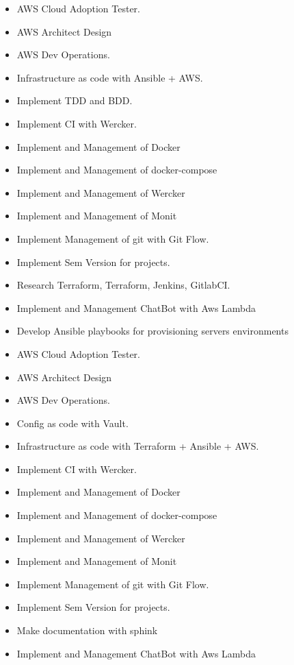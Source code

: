 \documentclass[10pt,a4paper]{altacv}
\begin{document}
\begin{itemize}
  \item AWS Cloud Adoption Tester.
  \item AWS Architect Design
  \item AWS Dev Operations.
  \item Infrastructure as code with Ansible + AWS.
  \item Implement TDD and BDD.
  \item Implement CI with Wercker.
  \item Implement and Management of Docker
  \item Implement and Management of docker-compose
  \item Implement and Management of Wercker
  \item Implement and Management of Monit
  \item Implement Management of git with Git Flow.
  \item Implement Sem Version for projects.
  \item Research Terraform, Terraform, Jenkins, GitlabCI.
  \item Implement and Management ChatBot with Aws Lambda
\end{itemize}

\divider

\begin{itemize}
  \item Develop Ansible playbooks for provisioning servers environments
  \item AWS Cloud Adoption Tester.
  \item AWS Architect Design
  \item AWS Dev Operations.
  \item Config as code with Vault.
  \item Infrastructure as code with Terraform + Ansible + AWS.
  \item Implement CI with Wercker.
  \item Implement and Management of Docker
  \item Implement and Management of docker-compose
  \item Implement and Management of Wercker
  \item Implement and Management of Monit
  \item Implement Management of git with Git Flow.
  \item Implement Sem Version for projects.
  \item Make documentation with sphink
  \item Implement and Management ChatBot with Aws Lambda
\end{itemize}
\end{document}
